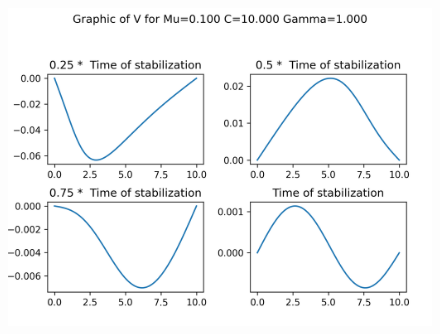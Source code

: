 \begin{figure}[H]
	\includegraphics[scale=0.5]{../graphs_data_nonsmooth_2/slices/Graph_V_mu0.100_C10.000_gamma1.000.png}
\end{figure}

